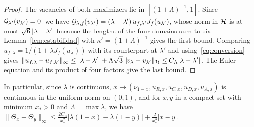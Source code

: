 \begin{proof} The vacancies of both maximizers lie in $[(1+\Lambda)^{-1},1]$. Since ${\mathcal{G}}_{\lambda'}(v_{\lambda'})=0$, we have
${\mathcal{G}}_{\lambda,f}(v_{\lambda'})=(\lambda-\lambda')\,u_{f,\lambda'}J_f(u_{\lambda'})$, whose norm in ${\mathcal{H}}$ is at most
$\sqrt6|\lambda-\lambda'|$ because the lengths of the four domains sum to six. Lemma~\ref{lem:estabilidad} with
$\kappa'=(1+\Lambda)^{-1}$ gives the first bound. Comparing $u_{f,\lambda}=1/(1+\lambda J_f(u_\lambda))$ with its counterpart at
$\lambda'$ and using~\eqref{eq:conversion} gives
$\|u_{f,\lambda}-u_{f,\lambda'}\|_\infty\le|\lambda-\lambda'|+\Lambda\sqrt3\,\|v_\lambda-v_{\lambda'}\|_{\mathcal{H}}\le
C_\Lambda|\lambda-\lambda'|$. The Euler equation and its product of four factors give the last bound. \end{proof}

In particular, since $\lambda$ is continuous, $x\mapsto(\nu_{1-x},u_{R,x},u_{C,x},u_{D,x},u_{A,x})$ is continuous in the uniform norm
on $(0,1)$, and for $x,y$ in a compact set with minimum $x_*>0$ and $\Lambda=\max\lambda$, we have
$\|\Theta_x-\Theta_y\|_\infty\le\frac{2C_\Lambda}{x_*^2}|\lambda(1-x)-\lambda(1-y)|+\frac2{x_*^3}|x-y|$.
